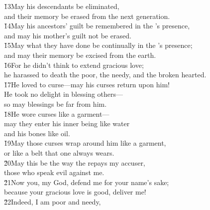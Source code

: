 \begin{poetry}
\poeml \v{13}May his descendants be eliminated, \\
\poemll    and their memory be erased from the next generation. \\
\poeml \v{14}May his ancestors' guilt be remembered in the 's presence, \\
\poemll    and may his mother's guilt not be erased. \\
\poeml \v{15}May what they have done be continually in the 's presence; \\
\poemll    and may their memory be excised from the earth. \\
\poeml \v{16}For he didn't think to extend gracious love; \\
\poemll    he harassed to death the poor, the needy, and the broken hearted. \\
\poeml \v{17}He loved to curse---may his curses return upon him! \\
\poemll    He took no delight in blessing others--- \\
\poemlll       so may blessings be far from him. \\
\poeml \v{18}He wore curses like a garment--- \\
\poemll    may they enter his inner being like water \\
\poemlll       and his bones like oil. \\
\poeml \v{19}May those curses wrap around him like a garment, \\
\poemll    or like a belt that one always wears. \\
\poeml \v{20}May this be the way the  repays my accuser, \\
\poemll    those who speak evil against me. \\
\poeml \v{21}Now you,  my God, defend me for your name's sake; \\
\poemll    because your gracious love is good, deliver me! \\
\poeml \v{22}Indeed, I am poor and needy, \\

\end{poetry}
